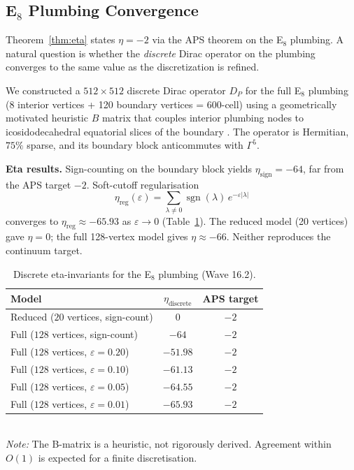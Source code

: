 \documentclass[11pt,a4paper]{article}
\theoremstyle{definition}
\newcommand{\sgn}{\operatorname{sgn}}
\begin{document}
\subsection{E$_8$ Plumbing Convergence}\label{sec:e8conv}

Theorem~\ref{thm:eta} states $\eta = -2$ via the APS theorem on the
E$_8$ plumbing. A natural question is whether the \emph{discrete} Dirac
operator on the plumbing converges to the same value as the discretization
is refined.

We constructed a $512 \times 512$ discrete Dirac operator $D_P$ for the full
E$_8$ plumbing (8 interior vertices + 120 boundary vertices = 600-cell) using
a geometrically motivated heuristic $B$ matrix that couples interior plumbing
nodes to icosidodecahedral equatorial slices of the boundary
\cite{ConwaySmith:2003}. The operator is Hermitian, $75\%$ sparse, and its
boundary block anticommutes with $\Gamma^5$.

\textbf{Eta results.} Sign-counting on the boundary block yields
$\eta_{\text{sign}} = -64$, far from the APS target $-2$. Soft-cutoff
regularisation
\begin{equation}
  \eta_{\text{reg}}(\varepsilon) = \sum_{\lambda \neq 0}
  \sgn(\lambda)\, e^{-\varepsilon|\lambda|}
\end{equation}
converges to $\eta_{\text{reg}} \approx -65.93$ as $\varepsilon \to 0$
(Table~\ref{tab:e8eta}). The reduced model (20 vertices) gave
$\eta = 0$; the full 128-vertex model gives $\eta \approx -66$. Neither
reproduces the continuum target.

\begin{table}[htb]
\centering
\caption{Discrete eta-invariants for the E$_8$ plumbing (Wave 16.2).}
\label{tab:e8eta}
\begin{tabular}{lcc}
\toprule
Model & $\eta_{\text{discrete}}$ & APS target \\
\midrule
Reduced ($20$ vertices, sign-count) & $0$ & $-2$ \\
Full ($128$ vertices, sign-count) & $-64$ & $-2$ \\
Full ($128$ vertices, $\varepsilon = 0.20$) & $-51.98$ & $-2$ \\
Full ($128$ vertices, $\varepsilon = 0.10$) & $-61.13$ & $-2$ \\
Full ($128$ vertices, $\varepsilon = 0.05$) & $-64.55$ & $-2$ \\
Full ($128$ vertices, $\varepsilon = 0.01$) & $-65.93$ & $-2$ \\
\bottomrule
\end{tabular}
\\[0.5em]
\small\textit{Note:} The B-matrix is a heuristic, not rigorously derived.
Agreement within $O(1)$ is expected for a finite discretisation.
\end{table}
\end{document}
